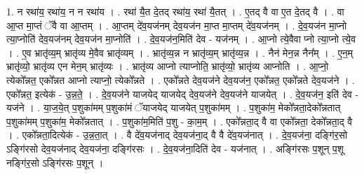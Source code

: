 \documentclass[17pt]{extarticle}
\begin{document}
1. न रथा॑य॒ रथा॑य॒ न न रथा॑य । . रथा॑ यै॒त दे॒तद् रथा॑य॒ रथा॑ यै॒तत् । . ए॒तद् वै वा ए॒त दे॒तद् वै । . वा आ॒प्त मा॒प्तं ॅवै वा आ॒प्तम् । . आ॒प्तम् दे॑व॒यज॑नम् देव॒यज॑न मा॒प्त मा॒प्तम् दे॑व॒यज॑नम् । . दे॒व॒यज॑न मा॒प्नो त्या॒प्नोति॑ देव॒यज॑नम् देव॒यज॑न मा॒प्नोति॑ । . दे॒व॒यज॑न॒मिति॑ देव - यज॑नम् । . आ॒प्नो त्ये॒वैवा प्नो त्या॒प्नो त्ये॒व । . ए॒व भ्रातृ॑व्य॒म् भ्रातृ॑व्य मे॒वैव भ्रातृ॑व्यम् । . भ्रातृ॑व्य॒न्न न भ्रातृ॑व्य॒म् भ्रातृ॑व्य॒न्न । . नैन॑ मेन॒न्न नैन᳚म् । . ए॒न॒म् भ्रातृ॑व्यो॒ भ्रातृ॑व्य एन मेन॒म् भ्रातृ॑व्यः । . भ्रातृ॑व्य आप्नो त्याप्नोति॒ भ्रातृ॑व्यो॒ भ्रातृ॑व्य आप्नोति । . आ॒प्नो॒ त्येको᳚न्नत॒ एको᳚न्नत आप्नो त्याप्नो॒ त्येको᳚न्नते । . एको᳚न्नते देव॒यज॑ने देव॒यज॑न॒ एको᳚न्नत॒ एको᳚न्नते देव॒यज॑ने । . एको᳚न्नत॒ इत्येक॑ - उ॒न्न॒ते॒ । . दे॒व॒यज॑ने याजयेद् याजयेद् देव॒यज॑ने देव॒यज॑ने याजयेत् । . दे॒व॒यज॑न॒ इति॑ देव - यज॑ने । . या॒ज॒ये॒त् प॒शुका॑मम् प॒शुका॑मं ॅयाजयेद् याजयेत् प॒शुका॑मम् । . प॒शुका॑म॒ मेको᳚न्नता॒देको᳚न्नतात् प॒शुका॑मम् प॒शुका॑म॒ मेको᳚न्नतात् । . प॒शुका॑म॒मिति॑ प॒शु - का॒म॒म् । . एको᳚न्नता॒द् वै वा एको᳚न्नता॒ देको᳚न्नता॒द् वै । . एको᳚न्नता॒दित्येक॑ - उ॒न्न॒ता॒त् । . वै दे॑व॒यज॑नाद् देव॒यज॑ना॒द् वै वै दे॑व॒यज॑नात् । . दे॒व॒यज॑ना॒ दङ्गि॑र॒सो ऽङ्गि॑रसो देव॒यज॑नाद् देव॒यज॑ना॒ दङ्गि॑रसः । . दे॒व॒यज॑ना॒दिति॑ देव - यज॑नात् । . अङ्गि॑रसः प॒शून् प॒शू नङ्गि॑र॒सो ऽङ्गि॑रसः प॒शून् । \newline
\end{document}

